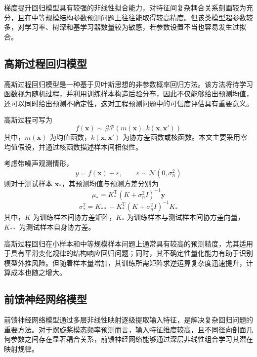 梯度提升回归模型具有较强的非线性拟合能力，对特征间复杂耦合关系刻画较为充分，且在中等规模结构参数预测问题上往往能取得较高精度。但该类模型超参数较多，对学习率、树深和基学习器数量较为敏感，若参数设置不当也容易发生过拟合。

\subsection{高斯过程回归模型}

高斯过程回归模型是一种基于贝叶斯思想的非参数概率回归方法\cite{intro:17}。该方法将待学习函数视为随机过程，并利用训练样本构造后验分布，因此不仅能够给出预测均值，还可以同时给出预测不确定性，这对工程预测问题中的可信度评估具有重要意义。

高斯过程可写为
\begin{equation}
  f(\mathbf{x}) \sim \mathcal{GP}\left(m(\mathbf{x}), k(\mathbf{x}, \mathbf{x}')\right)
\end{equation}
其中，$m(\mathbf{x})$ 为均值函数，$k(\mathbf{x}, \mathbf{x}')$ 为协方差函数或核函数。本文主要采用零均值假设，并通过核函数描述样本间相似性。

考虑带噪声观测情形，
\begin{equation}
  y = f(\mathbf{x}) + \varepsilon,
  \qquad
  \varepsilon \sim \mathcal{N}(0,\sigma_n^2)
\end{equation}
则对于测试样本 $\mathbf{x}_*$，其预测均值与预测方差分别为
\begin{equation}
  \mu_* = K_*^{\mathrm{T}}\left(K + \sigma_n^2 I\right)^{-1}\mathbf{y}
\end{equation}
\begin{equation}
  \sigma_*^2 = K_{**} - K_*^{\mathrm{T}}\left(K + \sigma_n^2 I\right)^{-1}K_*
\end{equation}
其中，$K$ 为训练样本间协方差矩阵，$K_*$ 为训练样本与测试样本间协方差向量，$K_{**}$ 为测试样本自身协方差。

高斯过程回归在小样本和中等规模样本问题上通常具有较高的预测精度，尤其适用于具有平滑变化规律的结构响应回归问题；同时，其不确定性量化能力有助于识别模型外推风险。但随着样本量增加，其训练所需矩阵求逆运算复杂度迅速提升，计算成本也随之增大。

\subsection{前馈神经网络模型}

前馈神经网络模型通过多层非线性映射逐级提取输入特征，是解决复杂回归问题的重要方法。对于螺旋桨模态频率预测而言，输入特征维度较高，且不同径向剖面几何参数之间存在显著耦合关系，前馈神经网络能够通过深层非线性组合学习其潜在映射规律。

